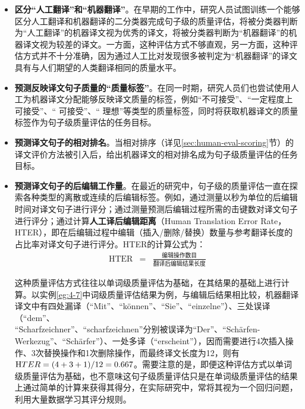 \begin{itemize}
\vspace{0.5em}
\item {\small\sffamily\bfseries{区分“人工翻译”和“机器翻译”}}。在早期的工作中，研究人员试图训练一个能够区分人工翻译和机器翻译的二分类器完成句子级的质量评估，将被分类器判断为“人工翻译”的机器译文视为优秀的译文，将被分类器判断为“机器翻译”的机器译文视为较差的译文。一方面，这种评估方式不够直观，另一方面，这种评估方式并不十分准确，因为通过人工比对发现很多被判定为“机器翻译”的译文具有与人们期望的人类翻译相同的质量水平。
\vspace{0.5em}
\item {\small\sffamily\bfseries{预测反映译文句子质量的“质量标签”}}。在同一时期，研究人员们也尝试使用人工为机器译文分配能够反映译文质量的标签，例如“不可接受”、“一定程度上可接受”、“ 可接受”、“ 理想”等类型的质量标签，同时将获取机器译文的质量标签作为句子级质量评估的任务目标。
\vspace{0.5em}
\item {\small\sffamily\bfseries{预测译文句子的相对排名}}。当相对排序（详见\ref{sec:human-eval-scoring}节）的译文评价方法被引入后，给出机器译文的相对排名成为句子级质量评估的任务目标。
\vspace{0.5em}
\item {\small\sffamily\bfseries{预测译文句子的后编辑工作量}}。在最近的研究中，句子级的质量评估一直在探索各种类型的离散或连续的后编辑标签。例如，通过测量以秒为单位的后编辑时间对译文句子进行评分；通过测量预测后编辑过程所需的击键数对译文句子进行评分；通过计算{\small\sffamily\bfseries{人工译后编辑距离}}（Human Translation Error Rate，HTER），即在后编辑过程中编辑（插入/删除/替换）数量与参考翻译长度的占比率对译文句子进行评分。HTER的计算公式为：
\vspace{0.5em}
\begin{eqnarray}
\textrm{HTER}&=& \frac{\mbox{编辑操作数目}}{\mbox{翻译后编辑结果长度}}
\label{eq:4-20}
\end{eqnarray}

\parinterval 这种质量评估方式往往以单词级质量评估为基础，在其结果的基础上进行计算。以实例\ref{eg:4-7}中词级质量评估结果为例，与编辑后结果相比较，机器翻译译文中有四处漏译（“Mit”、“können”、“Sie”、“einzelne”）、三处误译（“dem”、\\“Scharfzeichner”、“scharfzeichnen”分别被误译为“Der”、“Schärfen-Werkezug”、“Schärfer”）、一处多译（“erscheint”），因而需要进行4次插入操作、3次替换操作和1次删除操作，而最终译文长度为12，则有$\textrm HTER=(4+3+1)/12=0.667$。需要注意的是，即便这种评估方式以单词级质量评估为基础，也不意味这句子级质量评估只是在单词级质量评估的结果上通过简单的计算来获得其得分，在实际研究中，常将其视为一个回归问题，利用大量数据学习其评分规则。
\vspace{0.5em}
\end{itemize}

